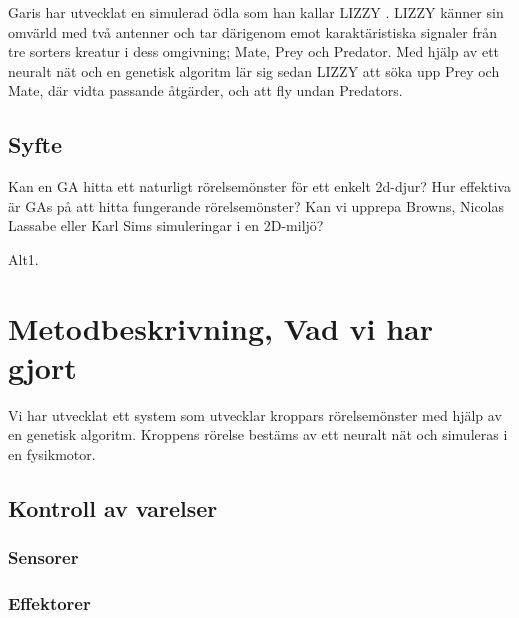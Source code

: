 \documentclass[titlepage, twocolumn, a4paper, 12pt]{article}
\begin{document}
Garis har utvecklat en simulerad ödla som han kallar LIZZY \cite{garis}. LIZZY känner sin omvärld med två antenner och tar därigenom emot karaktäristiska signaler från tre sorters kreatur i dess omgivning; Mate, Prey och Predator. Med hjälp av ett neuralt nät och en genetisk algoritm lär sig sedan LIZZY att söka upp Prey och Mate, där vidta passande åtgärder, och att fly undan Predators.

\subsection{Syfte}

Kan en GA hitta ett naturligt rörelsemönster för ett enkelt 2d-djur? 
Hur effektiva är GAs på att hitta fungerande rörelsemönster? 
Kan vi upprepa Browns, Nicolas Lassabe eller Karl Sims simuleringar i en 
2D-miljö? 

Alt1. 


\section{Metodbeskrivning, Vad vi har gjort}
Vi har utvecklat ett system som utvecklar kroppars rörelsemönster med hjälp av en genetisk algoritm. Kroppens rörelse bestäms av ett neuralt nät och simuleras i en fysikmotor.


\subsection{Kontroll av varelser}
\subsubsection{Sensorer}

        

\subsubsection{Effektorer}
\end{document}
